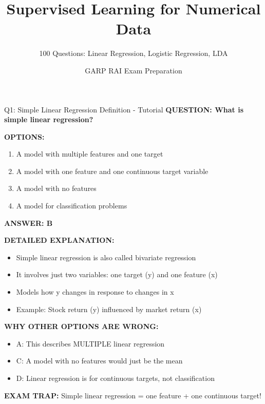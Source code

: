 \documentclass[8pt]{beamer}
\title{Supervised Learning for Numerical Data}
\subtitle{100 Questions: Linear Regression, Logistic Regression, LDA}
\author{GARP RAI Exam Preparation}
\date{}
\begin{document}
	
	\begin{frame}
		\titlepage
	\end{frame}
	
	
	\begin{frame}{Q1: Simple Linear Regression Definition - Tutorial}
		\fontsize{6.5}{7.5}\selectfont
		\textbf{QUESTION: What is simple linear regression?}
		
		\vspace{0.1cm}
		\textbf{OPTIONS:}
		\begin{enumerate}
			\item A model with multiple features and one target
			\item A model with one feature and one continuous target variable
			\item A model with no features
			\item A model for classification problems
		\end{enumerate}
		
		\vspace{0.1cm}
		\textcolor{myblue}{\textbf{ANSWER: B}}
		
		\vspace{0.1cm}
		\textbf{DETAILED EXPLANATION:}
		\begin{itemize}
			\item Simple linear regression is also called bivariate regression
			\item It involves just two variables: one target (y) and one feature (x)
			\item Models how y changes in response to changes in x
			\item Example: Stock return (y) influenced by market return (x)
		\end{itemize}
		
		\vspace{0.1cm}
		\textcolor{myred}{\textbf{WHY OTHER OPTIONS ARE WRONG:}}
		\begin{itemize}
			\item \textcolor{myred}{A:} This describes MULTIPLE linear regression
			\item \textcolor{myred}{C:} A model with no features would just be the mean
			\item \textcolor{myred}{D:} Linear regression is for continuous targets, not classification
		\end{itemize}
		
		\textcolor{myred}{\textbf{EXAM TRAP:}} Simple linear regression = \textcolor{myblue}{one feature + one continuous target}!
	\end{frame}
	
\end{document}
